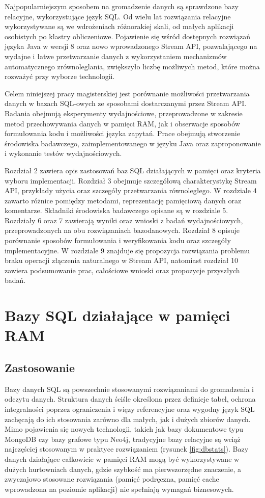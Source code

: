 \documentclass[12pt]{extarticle}
\begin{document}
    Najpopularniejszym sposobem na gromadzenie danych są sprawdzone bazy relacyjne, wykorzystujące język SQL. Od wielu lat rozwiązania relacyjne wykorzystywane są we wdrożeniach różnorakiej skali, od małych aplikacji osobistych po klastry obliczeniowe. Pojawienie się wśród dostępnych rozwiązań języka Java w wersji 8 oraz nowo wprowadzonego Stream API, pozwalającego na wydajne i łatwe przetwarzanie danych z wykorzystaniem mechanizmów automatycznego zrównoleglania, zwiększyło liczbę możliwych metod, które można rozważyć przy wyborze technologii.

	Celem niniejszej pracy magisterskiej jest porównanie możliwości przetwarzania danych w bazach SQL-owych ze sposobami dostarczanymi przez Stream API. Badania obejmują eksperymenty wydajnościowe, przeprowadzone w zakresie metod przechowywania danych w pamięci RAM, jak i obserwacje sposobów formułowania kodu i możliwości języka zapytań. Prace obejmują stworzenie środowiska badawczego, zaimplementowanego w języku Java oraz zaproponowanie i wykonanie testów wydajnościowych.

    Rozdział 2 zawiera opis zastosowań baz SQL działających w pamięci oraz kryteria wyboru implementacji. Rozdział 3 obejmuje szczegółową charakterystykę Stream API, przykłady użycia oraz szczegóły przetwarzania równoległego. W rozdziale 4 zawarto różnice pomiędzy metodami, reprezentację pamięciową danych oraz komentarze. Składniki środowiska badawczego opisane są w rozdziale 5. Rozdziały 6 oraz 7 zawierają wyniki oraz wnioski z badań wydajnościowych, przeprowadzonych na obu rozwiązaniach bazodanowych. Rozdział 8 opisuje porównanie sposobów formułowania i weryfikowania kodu oraz szczegóły implementacyjne. W rozdziale 9 znajduje się propozycja rozwiązania problemu braku operacji złączenia naturalnego w Stream API, natomiast rozdział 10 zawiera podsumowanie prac, całościowe wnioski oraz propozycje przyszłych badań.

\section{Bazy SQL działające w pamięci RAM}

\subsection{Zastosowanie}

    Bazy danych SQL są powszechnie stosowanymi rozwiązaniami do gromadzenia i odczytu danych. Struktura danych ściśle określona przez definicje tabel, ochrona integralności poprzez ograniczenia i więzy referencyjne oraz wygodny język SQL zachęcają do ich stosowania zarówno dla małych, jak i dużych zbiorów danych. Mimo pojawienia się nowych technologii, takich jak bazy dokumentowe typu MongoDB czy bazy grafowe typu Neo4j, tradycyjne bazy relacyjne są wciąż najczęściej stosowanym w praktyce rozwiązaniem (rysunek \ref{fig:dbstats}). Bazy danych działające całkowicie w pamięci RAM mogą być wykorzystywane w dużych hurtowniach danych, gdzie szybkość ma pierwszorzędne znaczenie, a zwyczajowo stosowane rozwiązania (pamięć podręczna, pamięć cache wprowadzona na poziomie aplikacji) nie spełniają wymagań biznesowych.
\end{document}
